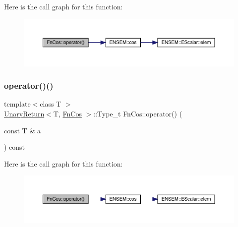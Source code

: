 Here is the call graph for this function\+:
\nopagebreak
\begin{figure}[H]
\begin{center}
\leavevmode
\includegraphics[width=350pt]{d1/d49/structFnCos_aaf33b1555b7687d8c211c90189ef0c5c_cgraph}
\end{center}
\end{figure}
\mbox{\label{structFnCos_aaf33b1555b7687d8c211c90189ef0c5c}} 
\subsubsection{\texorpdfstring{operator()()}{operator()()}\hspace{0.1cm}{\footnotesize\ttfamily [2/3]}}
{\footnotesize\ttfamily template$<$class T $>$ \\
\mbox{\hyperlink{structUnaryReturn}{Unary\+Return}}$<$T, \mbox{\hyperlink{structFnCos}{Fn\+Cos}} $>$\+::Type\+\_\+t Fn\+Cos\+::operator() (\begin{DoxyParamCaption}\item[{const T \&}]{a }\end{DoxyParamCaption}) const\hspace{0.3cm}{\ttfamily [inline]}}

Here is the call graph for this function\+:
\nopagebreak
\begin{figure}[H]
\begin{center}
\leavevmode
\includegraphics[width=350pt]{d1/d49/structFnCos_aaf33b1555b7687d8c211c90189ef0c5c_cgraph}
\end{center}
\end{figure}
\mbox{\label{structFnCos_aaf33b1555b7687d8c211c90189ef0c5c}} 
